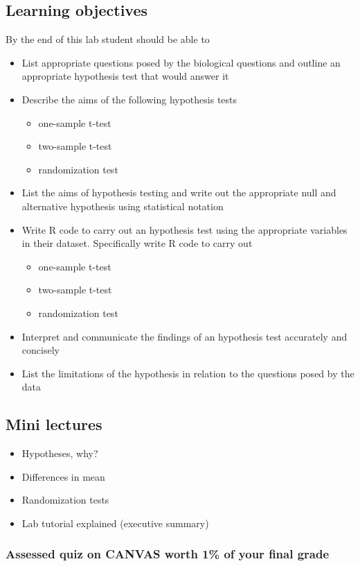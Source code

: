 \documentclass{article}
\begin{document}
\subsection*{Learning objectives}
By the end of this lab student should be able to
\begin{itemize}
\item List appropriate questions posed by the biological questions and  outline an appropriate hypothesis test that would answer it
\item Describe the aims of the following hypothesis tests
  \begin{itemize}
  \item one-sample t-test
  \item two-sample t-test
  \item randomization test
  \end{itemize}
\item List the aims of hypothesis testing and write out the appropriate null and alternative hypothesis using statistical notation
\item Write R code to carry out an hypothesis test using the appropriate variables in their dataset. Specifically write R code to carry out
  \begin{itemize}
  \item one-sample t-test
  \item two-sample t-test
  \item randomization test
  \end{itemize}
\item Interpret and communicate the findings of an hypothesis test accurately and concisely
\item List the limitations of the hypothesis in relation to the questions posed by the data
\end{itemize}

\subsection*{Mini lectures}

\begin{itemize}
\item Hypotheses, why?
\item Differences in mean
\item Randomization tests
\item Lab tutorial explained (executive summary)
\end{itemize}

\subsubsection*{Assessed quiz on CANVAS worth 1\% of your final grade}
\end{document}
